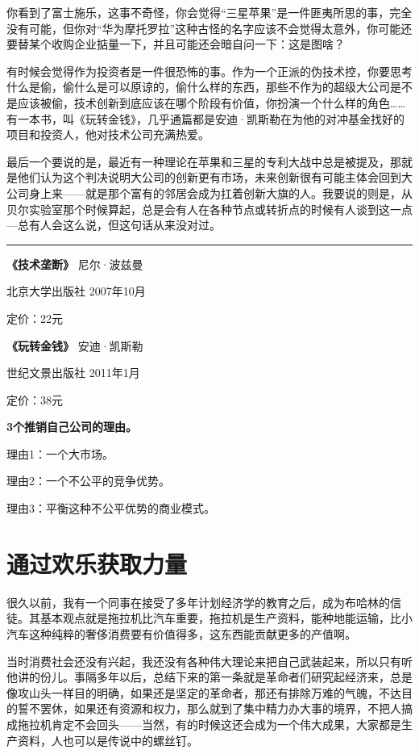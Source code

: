 你看到了富士施乐，这事不奇怪，你会觉得``三星苹果''是一件匪夷所思的事，完全没有可能，但你对``华为摩托罗拉''这种古怪的名字应该不会觉得太意外，你可能还要替某个收购企业掂量一下，并且可能还会暗自问一下：这是图啥？

有时候会觉得作为投资者是一件很恐怖的事。作为一个正派的伪技术控，你要思考什么是偷，偷什么是可以原谅的，偷什么样的东西，那些不作为的超级大公司是不是应该被偷，技术创新到底应该在哪个阶段有价值，你扮演一个什么样的角色\ldots{}\ldots{}有一本书，叫《玩转金钱》，几乎通篇都是安迪·凯斯勒在为他的对冲基金找好的项目和投资人，他对技术公司充满热爱。

最后一个要说的是，最近有一种理论在苹果和三星的专利大战中总是被提及，那就是他们认为这个判决说明大公司的创新更有市场，未来创新很有可能主体会回到大公司身上来------就是那个富有的邻居会成为扛着创新大旗的人。我要说的则是，从贝尔实验室那个时候算起，总是会有人在各种节点或转折点的时候有人谈到这一点---总有人会这么说，但这句话从来没对过。

\begin{center}\rule{3in}{0.4pt}\end{center}

\textbf{《技术垄断》} 尼尔·波兹曼

北京大学出版社 2007年10月

定价：22元

\textbf{《玩转金钱》} 安迪·凯斯勒

世纪文景出版社 2011年1月

定价：38元

\textbf{3个推销自己公司的理由。}

理由1：一个大市场。

理由2：一个不公平的竞争优势。

理由3：平衡这种不公平优势的商业模式。

\section{通过欢乐获取力量}

很久以前，我有一个同事在接受了多年计划经济学的教育之后，成为布哈林的信徒。其基本观点就是拖拉机比汽车重要，拖拉机是生产资料，能种地能运输，比小汽车这种纯粹的奢侈消费要有价值得多，这东西能贡献更多的产值啊。

当时消费社会还没有兴起，我还没有各种伟大理论来把自己武装起来，所以只有听他讲的份儿。事隔多年以后，总结下来的第一条就是革命者们研究起经济来，总是像攻山头一样目的明确，如果还是坚定的革命者，那还有排除万难的气魄，不达目的誓不罢休，如果还有资源和权力，那么就到了集中精力办大事的境界，不把人搞成拖拉机肯定不会回头------当然，有的时候这还会成为一个伟大成果，大家都是生产资料，人也可以是传说中的螺丝钉。

